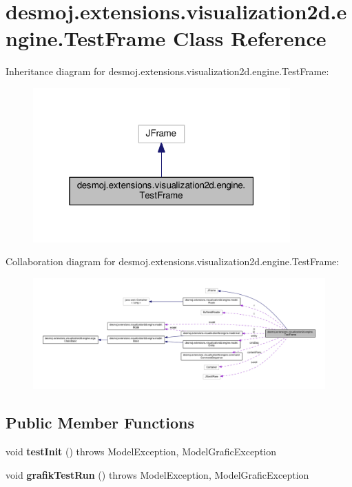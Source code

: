 \section{desmoj.\-extensions.\-visualization2d.\-engine.\-Test\-Frame Class Reference}
\label{classdesmoj_1_1extensions_1_1visualization2d_1_1engine_1_1_test_frame}


Inheritance diagram for desmoj.\-extensions.\-visualization2d.\-engine.\-Test\-Frame\-:
\nopagebreak
\begin{figure}[H]
\begin{center}
\leavevmode
\includegraphics[width=280pt]{classdesmoj_1_1extensions_1_1visualization2d_1_1engine_1_1_test_frame__inherit__graph}
\end{center}
\end{figure}


Collaboration diagram for desmoj.\-extensions.\-visualization2d.\-engine.\-Test\-Frame\-:
\nopagebreak
\begin{figure}[H]
\begin{center}
\leavevmode
\includegraphics[width=350pt]{classdesmoj_1_1extensions_1_1visualization2d_1_1engine_1_1_test_frame__coll__graph}
\end{center}
\end{figure}
\subsection*{Public Member Functions}
\begin{DoxyCompactItemize}
\item 
void {\bfseries test\-Init} ()  throws Model\-Exception, Model\-Grafic\-Exception\label{classdesmoj_1_1extensions_1_1visualization2d_1_1engine_1_1_test_frame_a7fadabadc4d710d3ffe1337abb5b028e}

\item 
void {\bfseries grafik\-Test\-Run} ()  throws Model\-Exception, Model\-Grafic\-Exception\label{classdesmoj_1_1extensions_1_1visualization2d_1_1engine_1_1_test_frame_a061a3a029bb1ea60551d75107a894d13}

\end{DoxyCompactItemize}
